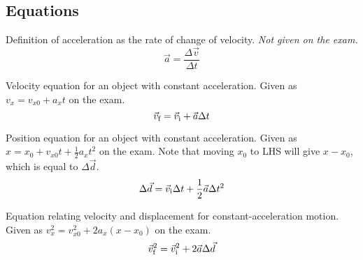 \documentclass{article}[11pt]
\numberwithin{equation}{section}
\begin{document}
        \subsection*{Equations}
            Definition of acceleration as the rate of change of velocity.
            \emph{Not given on the exam.}
            \begin{equation}
                \vec{a} = \frac{\Delta \vec{v}}{\Delta t}
            \end{equation}

            Velocity equation for an object with constant acceleration.
            Given as $v_x = v_{x0} + a_xt$ on the exam.
            \begin{equation}
                \vec{v}_\textup{f} = \vec{v}_\textup{i} + \vec{a}\Delta t
            \end{equation}

            Position equation for an object with constant acceleration.
            Given as $x = x_0 + v_{x0}t + \frac{1}{2}a_xt^2$ on the exam.
            Note that moving $x_0$ to LHS will give $x - x_0$,
            which is equal to $\Delta\vec{d}$.
            \begin{equation}
                \Delta \vec{d} =
                \vec{v}_\textup{i}\Delta t + \frac{1}{2}\vec{a}\Delta t^2
            \end{equation}

            Equation relating velocity and displacement for
            constant-acceleration motion. Given as
            $v^2_x = v^2_{x0} + 2a_x(x - x_0)$ on the exam.
            \begin{equation}
                \vec{v}^2_\textup{f} =
                \vec{v}^2_\textup{i} + 2\vec{a}\Delta\vec{d}
            \end{equation}
\end{document}
